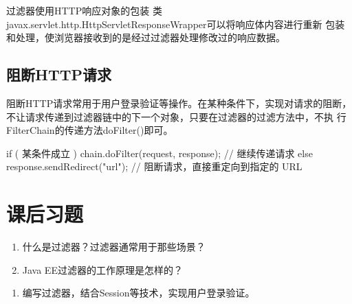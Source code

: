 
过滤器使用HTTP响应对象的包装
类javax.servlet.http.HttpServletResponseWrapper可以将响应体内容进行重新
包装和处理，使浏览器接收到的是经过过滤器处理修改过的响应数据。


\subsection{阻断HTTP请求} 

阻断HTTP请求常用于用户登录验证等操作。在某种条件下，实现对请求的阻断，
不让请求传递到过滤器链中的下一个对象，只要在过滤器的过滤方法中，不执
行FilterChain的传递方法doFilter()即可。

\begin{javaCode}
  if ( 某条件成立 ) {
    chain.doFilter(request, response); // 继续传递请求
  } else {
    response.sendRedirect("url"); // 阻断请求，直接重定向到指定的 URL
  }
\end{javaCode}

\section{课后习题}


\begin{enumerate}
\item 什么是过滤器？过滤器通常用于那些场景？
\item Java EE过滤器的工作原理是怎样的？
\end{enumerate}


\begin{enumerate}
\item 编写过滤器，结合Session等技术，实现用户登录验证。
\end{enumerate}